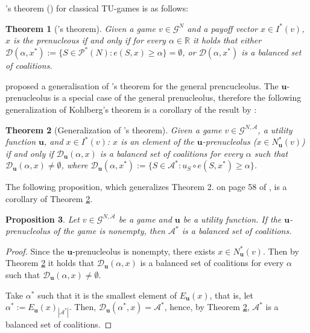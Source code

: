 \documentclass[a4paper,12pt]{article}
\newtheorem{theorem}{Theorem}
\newtheorem{proposition}[theorem]{Proposition}
\theoremstyle{definition}
\theoremstyle{remark}
\begin{document}
\citeauthor{Kohlberg1971}'s theorem (\cite{Kohlberg1971}) for classical TU-games is as follows: 

\begin{theorem}[\citeauthor{Kohlberg1971}'s theorem]
Given a game $v \in \mathcal{G}^N$ and a payoff vector $x\in I^*(v)$, $x$ is the prenucleous if and only if for every $\alpha \in \mathbb{R}$ it holds that
either $\mathcal{D}(\alpha, x^\ast) := \{ S\in \mathcal{P}^*(N) \colon e(S, x) \geq \alpha \} = \emptyset$, or $\mathcal{D}(\alpha, x^\ast)$ is a balanced set of coalitions.
\end{theorem}

\citet{MaschlerPottersTijs1992} proposed a generalisation of \citeauthor{Kohlberg1971}'s theorem for the general prencucleolus. The $\mathbf{u}$-prenucleolus is a special case of the general prenucleolus, therefore the following generalization of Kohlberg's theorem is a corollary of the result by \cite{MaschlerPottersTijs1992}:

\begin{theorem}[Generalization of \citeauthor{Kohlberg1971}'s theorem]\label{th:Kohlberg}
Given a game $v \in \mathcal{G}^{N,\mathcal{A}}$, a utility function $\mathbf{u}$, and $x \in I^\ast (v)$: $x$ is an element of the $\mathbf{u}$-prenucleolus ($x \in N_{\mathbf{u}}^\ast (v)$) if and only if $\mathcal{D}_{\mathbf{u}}(\alpha, x)$ is a balanced set of coalitions for every $\alpha$ such that $\mathcal{D}_{\mathbf{u}}(\alpha, x) \neq \emptyset$, where $\mathcal{D}_{\mathbf{u}}(\alpha , x^\ast) := \{ S\in \mathcal{A}^\ast \colon  u_S \circ e(S, x^\ast) \geq \alpha \}$.
\end{theorem}

The following proposition, which generalizes Theorem 2. on page 58 of \citet{Katsev2013}, is a corollary of Theorem \ref{th:Kohlberg}.

\begin{proposition}\label{th:Katsev1}
Let $v\in \mathcal{G}^{N, \mathcal{A}}$ be a game and $\mathbf{u}$ be a utility function. If the $\mathbf{u}$-prenucleolus of the game is nonempty, then $\mathcal{A}^\ast$ is a balanced set of coalitions.
\end{proposition}

\begin{proof}
Since the $\mathbf{u}$-prenucleolus is nonempty, there exists $x \in N_{\mathbf{u}}^\ast (v)$. Then by Theorem \ref{th:Kohlberg} it holds that $\mathcal{D}_{\mathbf{u}}(\alpha , x)$ is a balanced set of coalitions for every $\alpha$ such that $\mathcal{D}_{\mathbf{u}}(\alpha, x) \neq \emptyset$.

Take $\alpha^\ast$ such that it is the smallest element of $E_{\mathbf{u}}(x)$, that is, let $\alpha^* := E_{\mathbf{u}}(x)_{|\mathcal{A}^\ast|}$. Then, $\mathcal{D}_{\mathbf{u}}(\alpha ^\ast, x) = \mathcal{A}^\ast$, hence, by Theorem \ref{th:Kohlberg}, $\mathcal{A}^\ast$ is a balanced set of coalitions.
\end{proof}
\end{document}
